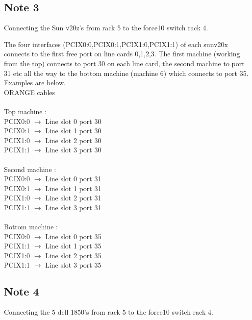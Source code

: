 \documentclass[a4paper]{article}
\begin{document}
\subsection{Note 3}

Connecting the Sun v20z's from rack 5 to the force10 switch rack 4.

The four interfaces (PCIX0:0,PCIX0:1,PCIX1:0,PCIX1:1) of each sunv20x connects
to the first free port on line cards 0,1,2,3. The first machine
(working from the top) connects to port 30 on each line card, the
second machine to port 31 etc all the way to the bottom machine
(machine 6) which connects to port 35. Examples are below.
\\
ORANGE cables\\
\\
Top machine : \\
PCIX0:0 $\rightarrow$ Line slot 0 port 30\\
PCIX0:1 $\rightarrow$ Line slot 1 port 30\\
PCIX1:0 $\rightarrow$ Line slot 2 port 30\\
PCIX1:1 $\rightarrow$ Line slot 3 port 30\\
\\
Second machine :\\
PCIX0:0 $\rightarrow$ Line slot 0 port 31\\
PCIX0:1 $\rightarrow$ Line slot 1 port 31\\
PCIX1:0 $\rightarrow$ Line slot 2 port 31\\
PCIX1:1 $\rightarrow$ Line slot 3 port 31\\
\\
Bottom machine :\\
PCIX0:0 $\rightarrow$ Line slot 0 port 35\\
PCIX1:1 $\rightarrow$ Line slot 1 port 35\\
PCIX1:0 $\rightarrow$ Line slot 2 port 35\\
PCIX1:1 $\rightarrow$ Line slot 3 port 35\\

\subsection{Note 4}

Connecting the 5 dell 1850's from rack 5 to the force10 switch rack 4.
\end{document}
